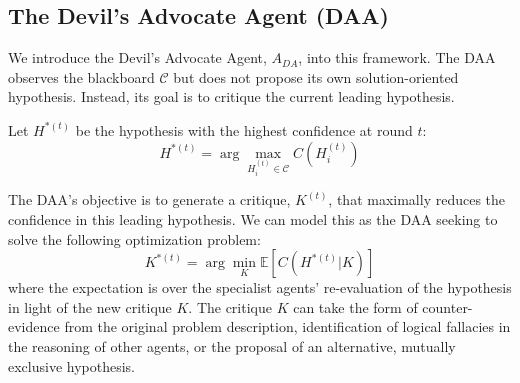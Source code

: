 \documentclass{article}
\begin{document}
\subsection{The Devil's Advocate Agent (DAA)}

We introduce the Devil's Advocate Agent, $A_{DA}$, into this framework. The DAA observes the blackboard $\mathcal{C}$ but does not propose its own solution-oriented hypothesis. Instead, its goal is to critique the current leading hypothesis.

Let $H^{*(t)}$ be the hypothesis with the highest confidence at round $t$:
\begin{equation}
    H^{*(t)} = \arg\max_{H_i^{(t)} \in \mathcal{C}} C(H_i^{(t)})
\end{equation}

The DAA's objective is to generate a critique, $K^{(t)}$, that maximally reduces the confidence in this leading hypothesis. We can model this as the DAA seeking to solve the following optimization problem:
\begin{equation}
    K^{*(t)} = \arg\min_{K} \mathbb{E}[C(H^{*(t)} | K)]
\end{equation}
where the expectation is over the specialist agents' re-evaluation of the hypothesis in light of the new critique $K$. The critique $K$ can take the form of counter-evidence from the original problem description, identification of logical fallacies in the reasoning of other agents, or the proposal of an alternative, mutually exclusive hypothesis.
\end{document}
